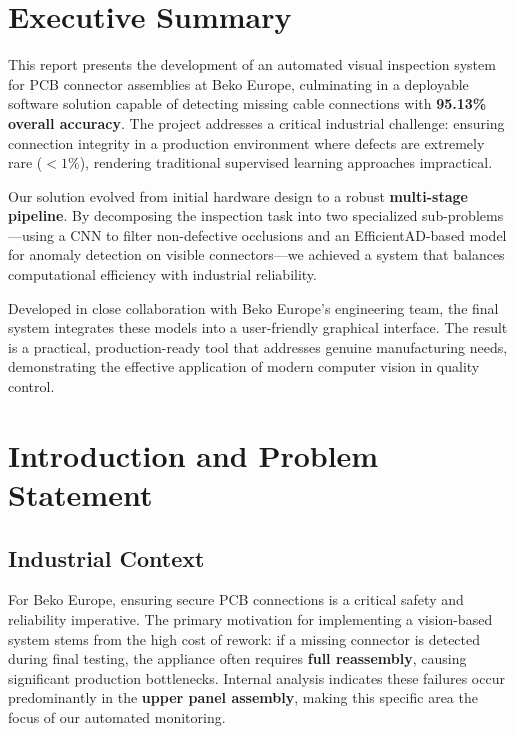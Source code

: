 \documentclass[11pt,a4paper,draft]{article}
\begin{document}
\newpage

\tableofcontents
\newpage


\section{Executive Summary}

This report presents the development of an automated visual inspection system for PCB connector assemblies at Beko Europe, culminating in a deployable software solution capable of detecting missing cable connections with \textbf{95.13\% overall accuracy}. The project addresses a critical industrial challenge: ensuring connection integrity in a production environment where defects are extremely rare ($<1\%$), rendering traditional supervised learning approaches impractical.

Our solution evolved from initial hardware design to a robust \textbf{multi-stage pipeline}. By decomposing the inspection task into two specialized sub-problems—using a CNN to filter non-defective occlusions and an EfficientAD-based model for anomaly detection on visible connectors—we achieved a system that balances computational efficiency with industrial reliability.

Developed in close collaboration with Beko Europe's engineering team, the final system integrates these models into a user-friendly graphical interface. The result is a practical, production-ready tool that addresses genuine manufacturing needs, demonstrating the effective application of modern computer vision in quality control.

\section{Introduction and Problem Statement}

\subsection{Industrial Context}

For Beko Europe, ensuring secure PCB connections is a critical safety and reliability imperative. The primary motivation for implementing a vision-based system stems from the high cost of rework: if a missing connector is detected during final testing, the appliance often requires \textbf{full reassembly}, causing significant production bottlenecks. Internal analysis indicates these failures occur predominantly in the \textbf{upper panel assembly}, making this specific area the focus of our automated monitoring.
\end{document}
